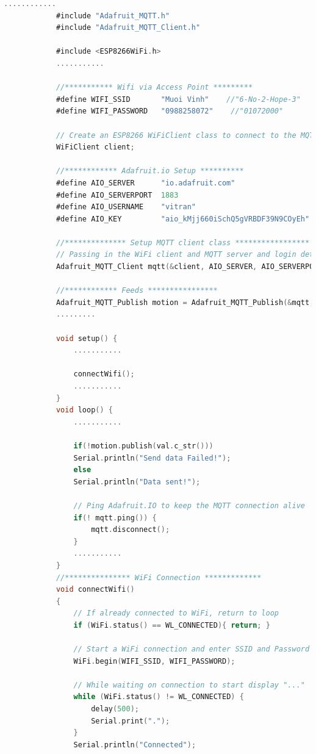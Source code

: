 \documentclass[13pt,a4paper]{article}
\begin{document}
		 \begin{lstlisting}[language=C, caption= MQTT sending data, label=test_float]
		 	............
		 	#include "Adafruit_MQTT.h"                    
		 	#include "Adafruit_MQTT_Client.h"                 
		 	
		 	#include <ESP8266WiFi.h>
		 	...........
		 	
		 	//*********** Wifi via Access Point *********
		 	#define WIFI_SSID       "Muoi Vinh"    //"6-No-2-Hope-3"
		 	#define WIFI_PASSWORD   "0988258072"    //"01072000"
		 	
		 	// Create an ESP8266 WiFiClient class to connect to the MQTT server.
		 	WiFiClient client;
		 	
		 	//************ Adafruit.io Setup **********
		 	#define AIO_SERVER      "io.adafruit.com"
		 	#define AIO_SERVERPORT  1883                               
		 	#define AIO_USERNAME    "vitran"                            
		 	#define AIO_KEY         "aio_kMjj660iSchQ5gVRBDF39N9COyEh"           
		 	
		 	//************** Setup MQTT client class *****************
		 	// Passing in the WiFi client and MQTT server and login details.
		 	Adafruit_MQTT_Client mqtt(&client, AIO_SERVER, AIO_SERVERPORT, AIO_USERNAME, AIO_KEY);
		 	
		 	//************ Feeds ****************
		 	Adafruit_MQTT_Publish motion = Adafruit_MQTT_Publish(&mqtt, AIO_USERNAME "/feeds/temperature");
		 	.........
		 	
		 	void setup() {
		 		...........
		 		
		 		connectWifi();
		 		...........
		 	}
		 	void loop() {
		 		...........
		 		
		 		if(!motion.publish(val.c_str()))
		 		Serial.println("Send data Failed!");
		 		else
		 		Serial.println("Data sent!");
		 		
		 		// Ping Adafruit.IO to keep the MQTT connection alive
		 		if(! mqtt.ping()) {
		 			mqtt.disconnect();
		 		}                
		 		...........
		 	}
	 		//*************** WiFi Connection *************
	 		void connectWifi()
	 		{   
	 			// If already connected to WiFi, return to loop
	 			if (WiFi.status() == WL_CONNECTED){ return; }        
	 			
	 			// Start a WiFi connection and enter SSID and Password   
	 			WiFi.begin(WIFI_SSID, WIFI_PASSWORD);   
	 			
	 			// While waiting on connection to start display "..."                   
	 			while (WiFi.status() != WL_CONNECTED) {     
	 				delay(500);
	 				Serial.print(".");                  
	 			} 
	 			Serial.println("Connected");    
	 			

\end{lstlisting}
\end{document}
